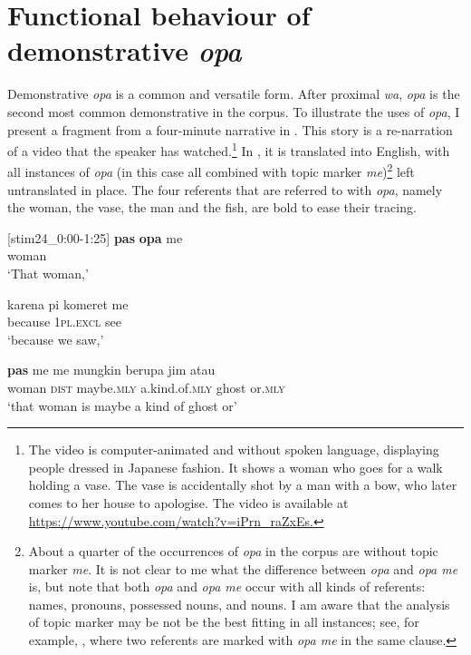 \documentclass[output=paper,colorlinks,citecolor=brown]{langscibook}
\begin{document}
\section{Functional behaviour of demonstrative \textit{opa}}
\label{sec:funct}
Demonstrative \textit{opa} is a common and versatile form.  After proximal \textit{wa}, \textit{opa} is the second most common demonstrative in the corpus. To illustrate the uses of \textit{opa}, I present a fragment from a four-minute narrative in . This story is a re-narration of a video that the speaker has watched.\footnote{The video is computer-animated and without spoken language, displaying people dressed in Japanese fashion. It shows a woman who goes for a walk holding a vase. The vase is accidentally shot by a man with a bow, who later comes to her house to apologise. The video is available at \url{https://www.youtube.com/watch?v=iPrn_raZxEs.}} In , it is translated into English, with all instances of \textit{opa} (in this case all combined with topic marker \textit{me})\footnote{About a quarter of the occurrences of \textit{opa} in the corpus are without topic marker \textit{me}. It is not clear to me what the difference between \textit{opa} and \textit{opa me} is, but note that both \textit{opa} and \textit{opa me} occur with all kinds of referents: names, pronouns, possessed nouns, and nouns. I am aware that the analysis of topic marker may be not be the best fitting in all instances; see, for example, , where two referents are marked with \textit{opa me} in the same clause.} left untranslated in place. The four referents that are referred to with \textit{opa}, namely the woman, the vase, the man and  the fish, are bold to ease their tracing.

\ea\label{exe:fishnarr} {[stim24\_0:00-1:25]}
\ea\label{exe:fishnarr:a} \gll \textbf{pas} \textbf{opa} me\\
woman {\glopa} {\glme}\\
\glt `That woman,'

\ex\label{exe:fishnarr:b} \gll karena pi komeret me\\
because \textsc{1pl.excl} see {\glme}\\
\glt `because we saw,'

\ex\label{exe:fishnarr:c} \gll \textbf{pas} me me mungkin berupa jim atau\\
woman \textsc{dist} {\glme} maybe.\textsc{mly} a.kind.of.\textsc{mly} ghost or.\textsc{mly}\\
\glt `that woman is maybe a kind of ghost or'
\end{document}
